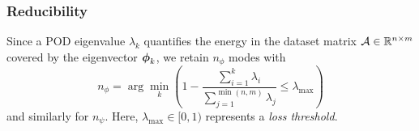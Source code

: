 \documentclass[10pt,xcolor=dvipsnames]{beamer}
\begin{document}

\begin{frame}[t]
  
  \frametitle{Reducibility}
  
  \justifying Since a POD eigenvalue $\lambda_k$ quantifies the energy in the dataset matrix ${\mathcal A} \in {\mathbb R}^{n \times m}$ covered by the eigenvector ${\boldsymbol \phi}_k$, we retain $n_\phi$ modes with
  \begin{equation*}
   n_\phi = \arg \min_{k} \left( 1 - \frac{\sum_{i = 1}^{k} \lambda_i}{\sum_{j = 1}^{\min(n, m)} \lambda_j} \leq \lambda_{\max} \right)
  \end{equation*}
  and similarly for $n_\psi$. Here, $\lambda_{\max}\in[0, 1)$ represents a \textit{loss threshold}.
  

\end{frame}
\end{document}
